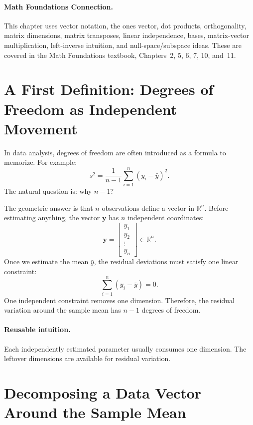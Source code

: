 \paragraph{Math Foundations Connection.}
This chapter uses vector notation, the ones vector, dot products, orthogonality, matrix dimensions, matrix transposes, linear independence, bases, matrix-vector multiplication, left-inverse intuition, and null-space/subspace ideas.  These are covered in the Math Foundations textbook, Chapters~2, 5, 6, 7, 10, and~11.

\section{A First Definition: Degrees of Freedom as Independent Movement}

In data analysis, degrees of freedom are often introduced as a formula to memorize.  For example:
\begin{equation}
  s^2 = \frac{1}{n-1}\sum_{i=1}^n (y_i-\bar{y})^2.
\end{equation}
The natural question is: why \(n-1\)?

The geometric answer is that \(n\) observations define a vector in \(\mathbb{R}^n\).  Before estimating anything, the vector \(\mathbf{y}\) has \(n\) independent coordinates:
\begin{equation}
  \mathbf{y}=\begin{bmatrix}y_1\\y_2\\\vdots\\y_n\end{bmatrix}\in\mathbb{R}^n.
\end{equation}
Once we estimate the mean \(\bar{y}\), the residual deviations must satisfy one linear constraint:
\begin{equation}
  \sum_{i=1}^n (y_i-\bar{y}) = 0.
\end{equation}
One independent constraint removes one dimension.  Therefore, the residual variation around the sample mean has \(n-1\) degrees of freedom.

\paragraph{Reusable intuition.}
Each independently estimated parameter usually consumes one dimension.  The leftover dimensions are available for residual variation.

\section{Decomposing a Data Vector Around the Sample Mean}

